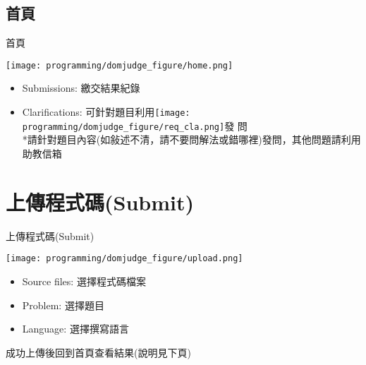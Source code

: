 \documentclass[aspectratio=169,xcolor=dvipsnames]{beamer}
\begin{document}
    \subsection{首頁}
    \begin{frame}{首頁}
        \centerline{\texttt{[image: programming/domjudge\_figure/home.png]}}
        \begin{itemize}
            \item Submissions: 繳交結果紀錄
            \item Clarifications: 可針對題目利用\texttt{[image: programming/domjudge\_figure/req\_cla.png]}發 問 \\
            *請針對題目內容(如敍述不清，請不要問解法或錯哪裡)發問，其他問題請利用助教信箱
        \end{itemize}
        
    \end{frame}
 
    \section{上傳程式碼(Submit)}

    \begin{frame}{上傳程式碼(Submit)}
        \begin{multicols}{2}
            \texttt{[image: programming/domjudge\_figure/upload.png]} \\
            \vspace{1em}
            \begin{itemize}
                \item Source files: 選擇程式碼檔案
                \item Problem: 選擇題目
                \item Language: 選擇撰寫語言
            \end{itemize}
            \vspace{1em}
            成功上傳後回到首頁查看結果(說明見下頁)
        \end{multicols}
    \end{frame}
    
\end{document}

